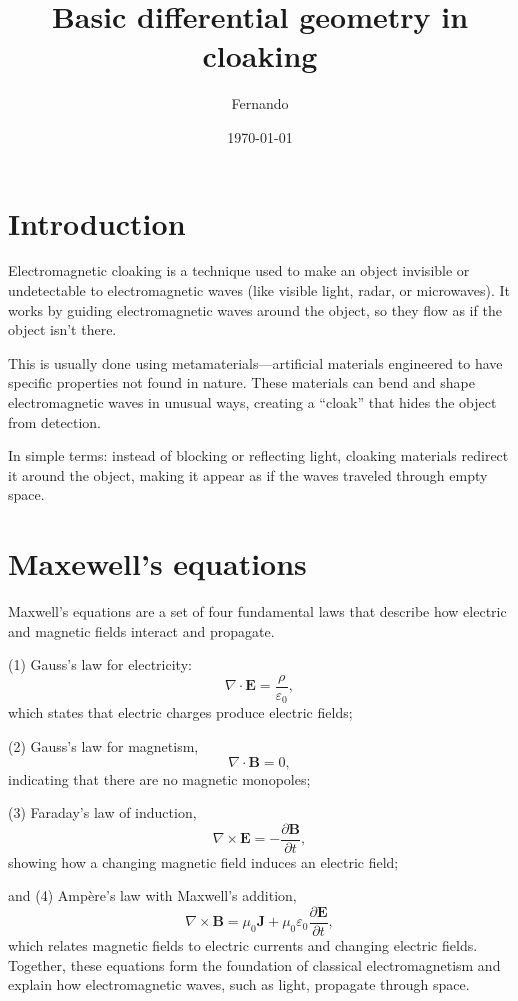 \documentclass{amsart}
\begin{document}
\newcommand{\R}{\mathbb{R}}
\newcommand\tbf[1]{\textbf{#1}}
\newcommand\myworries[1]{\textcolor{red}{\tbf{#1}}}

\title{Basic differential geometry in cloaking}
\author{Fernando}
\date{\today}
\maketitle

\section{Introduction}
Electromagnetic cloaking is a technique used to make an object invisible or undetectable to electromagnetic waves (like visible light, radar, or microwaves). It works by guiding electromagnetic waves around the object, so they flow as if the object isn’t there.

This is usually done using metamaterials—artificial materials engineered to have specific properties not found in nature. These materials can bend and shape electromagnetic waves in unusual ways, creating a “cloak” that hides the object from detection.

In simple terms: instead of blocking or reflecting light, cloaking materials redirect it around the object, making it appear as if the waves traveled through empty space.

\section{Maxewell's equations}

Maxwell's equations are a set of four fundamental laws that describe how electric and magnetic fields interact and propagate.

(1) Gauss's law for electricity:
\[\nabla \cdot \mathbf{E} = \frac{\rho}{\varepsilon_0},\]
which states that electric charges produce electric fields;

(2) Gauss's law for magnetism,
\[\nabla \cdot \mathbf{B} = 0,\]
indicating that there are no magnetic monopoles;

(3) Faraday's law of induction,
\[\nabla \times \mathbf{E} = -\frac{\partial \mathbf{B}}{\partial t},\]
showing how a changing magnetic field induces an electric field;

and (4) Ampère's law with Maxwell's addition,
\[\nabla \times \mathbf{B} = \mu_0 \mathbf{J} + \mu_0 \varepsilon_0 \frac{\partial \mathbf{E}}{\partial t},\]
which relates magnetic fields to electric currents and changing electric fields.
Together, these equations form the foundation of classical electromagnetism and explain how electromagnetic waves, such as light, propagate through space.
\end{document}

